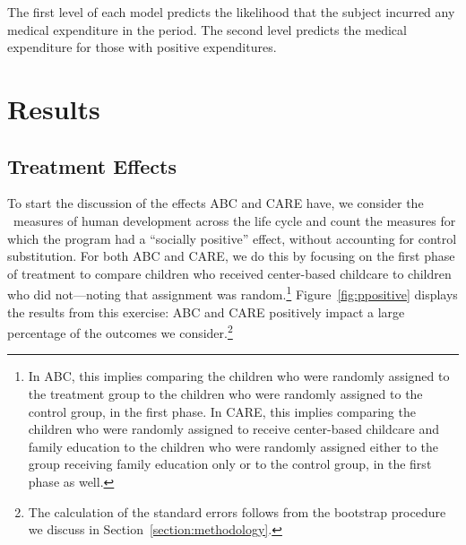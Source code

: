 \noindent The first level of each model predicts the likelihood that the subject incurred any medical expenditure in the period. The second level predicts the medical expenditure for those with positive expenditures.

\section{Results} \label{section:results}

\subsection{Treatment Effects} \label{section:teresults}

\noindent To start the discussion of the effects ABC and CARE have, we consider the \noutcomes\ measures of human development across the life cycle and count the measures for which the program had a ``socially positive'' effect, without accounting for control substitution. For both ABC and CARE, we do this by focusing on the first phase of treatment to compare children who received center-based childcare to children who did not---noting that assignment was random.\footnote{In ABC, this implies comparing the children who were randomly assigned to the treatment group to the children who were randomly assigned to the control group, in the first phase. In CARE, this implies comparing the children who were randomly assigned to receive center-based childcare and family education to the children who were randomly assigned either to the group receiving family education only or to the control group, in the first phase as well.} Figure~\ref{fig:ppositive} displays the results from this exercise: ABC and CARE positively impact a large percentage of the outcomes we consider.\footnote{The calculation of the standard errors follows from the bootstrap procedure we discuss in Section~\ref{section:methodology}.}

